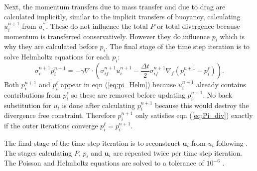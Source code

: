 \documentclass[draft]{agujournal2019}
\begin{document}
Next, the momentum transfers due to mass transfer and due to drag
are calculated implicitly, similar to the implicit transfers of buoyancy,
calculating $u_{i}^{n+1}$ from $u_{i}^{\prime\prime}$. These do
not influence the total $P$ or total divergence because momentum
is transferred conservatively. However they do influence $p_{i}$
which is why they are calculated before $p_{i}$. The final stage
of the time step iteration is to solve Helmholtz equations for each
$p_{i}$:
\begin{equation}
\sigma_{i}^{n+1}p_{i}^{n+1}=-\gamma\nabla\cdot\left(\sigma_{if}^{n+1}u_{i}^{n+1}-\frac{\Delta t}{2}\sigma_{if}^{n+1}\nabla_{f}\left(p_{i}^{n+1}-p_{i}^{\ell}\right)\right).\label{eq:pi_Helm}
\end{equation}
Both $p_{i}^{n+1}$ and $p_{i}^{\ell}$ appear in eqn (\ref{eq:pi_Helm})
because $u_{i}^{n+1}$ already contains contributions from $p_{i}^{\ell}$
so these are removed before updating $p_{i}^{n+1}$. No back substitution
for $u_{i}$ is done after calculating $p_{i}^{n+1}$ because this
would destroy the divergence free constraint. Therefore $p_{i}^{n+1}$
only satisfies eqn (\ref{eq:Pi_div}) exactly if the outer iterations
converge  $p_{i}^{\ell}=p_{i}^{n+1}$. 

The final stage of the time step iteration is to reconstruct $\mathbf{u}_{i}$
from $u_{i}$ following . The stages calculating $P$,
$p_{i}$ and $\mathbf{u}_{i}$ are repeated twice per time step iteration.
The Poisson and Helmholtz equations are solved to a tolerance of $10^{-6}$
.

\subsection{\label{sec:cAveraging} }

\end{document}

